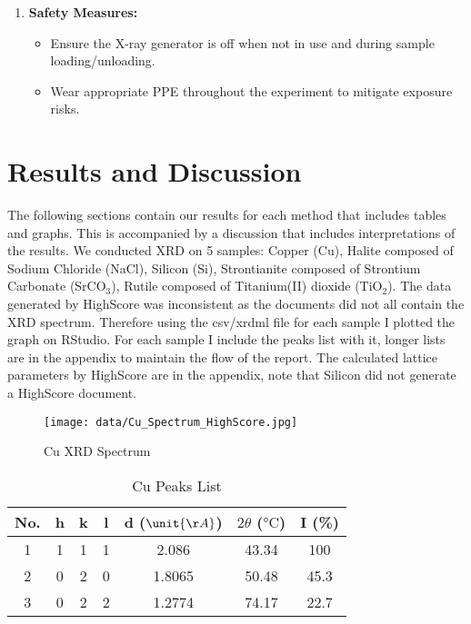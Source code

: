 \documentclass[11pt]{article}
\begin{document}
\begin{enumerate}
\begin{enumerate}
			\item \textbf{Safety Measures:}
			\begin{itemize}
				\item Ensure the X-ray generator is off when not in use and during sample loading/unloading.
				\item Wear appropriate PPE throughout the experiment to mitigate exposure risks.
			\end{itemize}
		\end{enumerate}
	\end{enumerate}
	

\clearpage

	\section{Results and Discussion}
	
	The following sections contain our results for each method that includes tables and graphs. This is accompanied by a discussion that includes interpretations of the results. We conducted XRD on 5 samples: Copper (Cu), Halite composed of Sodium Chloride (NaCl), Silicon (Si), Strontianite composed of Strontium Carbonate (SrCO$_3$), Rutile composed of Titanium(II) dioxide (TiO$_2$). The data generated by HighScore was inconsistent as the documents did not all contain the XRD spectrum. Therefore using the csv/xrdml file for each sample I plotted the graph on RStudio. For each sample I include the peaks list with it, longer lists are in the appendix to maintain the flow of the report. The calculated lattice parameters by HighScore are in the appendix, note that Silicon did not generate a HighScore document.
	
	\begin{figure}[!ht]
		\centering
		\texttt{[image: data/Cu\_Spectrum\_HighScore.jpg]}
		\caption{Cu XRD Spectrum}
	\end{figure}
	
	\begin{table}[htbp]
		\centering
		\begin{tabular}{ccccccc}
			\toprule
			No. & h & k & l & d ($\unit{\AA}$) & $2\theta$ ($\unit{\degreeCelsius}$) & I (\%) \\
			\midrule
			1 & 1 & 1 & 1 & 2.086 & 43.34 & 100 \\
			2 & 0 & 2 & 0 & 1.8065 & 50.48 & 45.3 \\
			3 & 0 & 2 & 2 & 1.2774 & 74.17 & 22.7 \\
			\bottomrule
		\end{tabular}%
		\caption{Cu Peaks List}
		\label{tab:Copper_Peaks}%
	\end{table}%
	
\end{document}
